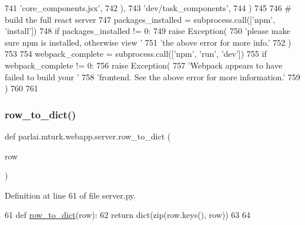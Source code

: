 \begin{DoxyCode}
741             \textcolor{stringliteral}{'core\_components.jsx'},
742         ),
743         \textcolor{stringliteral}{'dev/task\_components'},
744     )
745 
746     \textcolor{comment}{# build the full react server}
747     packages\_installed = subprocess.call([\textcolor{stringliteral}{'npm'}, \textcolor{stringliteral}{'install'}])
748     \textcolor{keywordflow}{if} packages\_installed != 0:
749         \textcolor{keywordflow}{raise} Exception(
750             \textcolor{stringliteral}{'please make sure npm is installed, otherwise view '}
751             \textcolor{stringliteral}{'the above error for more info.'}
752         )
753 
754     webpack\_complete = subprocess.call([\textcolor{stringliteral}{'npm'}, \textcolor{stringliteral}{'run'}, \textcolor{stringliteral}{'dev'}])
755     \textcolor{keywordflow}{if} webpack\_complete != 0:
756         \textcolor{keywordflow}{raise} Exception(
757             \textcolor{stringliteral}{'Webpack appears to have failed to build your '}
758             \textcolor{stringliteral}{'frontend. See the above error for more information.'}
759         )
760 
761 
\end{DoxyCode}
\mbox{\label{namespaceparlai_1_1mturk_1_1webapp_1_1server_a92be47964fa33a4b6a14d4069d091c7d}} 
\subsubsection{\texorpdfstring{row\+\_\+to\+\_\+dict()}{row\_to\_dict()}}
{\footnotesize\ttfamily def parlai.\+mturk.\+webapp.\+server.\+row\+\_\+to\+\_\+dict (\begin{DoxyParamCaption}\item[{}]{row }\end{DoxyParamCaption})}



Definition at line 61 of file server.\+py.


\begin{DoxyCode}
61 \textcolor{keyword}{def }\hyperlink{namespaceparlai_1_1mturk_1_1webapp_1_1server_a92be47964fa33a4b6a14d4069d091c7d}{row\_to\_dict}(row):
62     \textcolor{keywordflow}{return} dict(zip(row.keys(), row))
63 
64 
\end{DoxyCode}
\mbox{\label{namespaceparlai_1_1mturk_1_1webapp_1_1server_a12f6bdadae00003ac87686d5fd7a26df}} 
